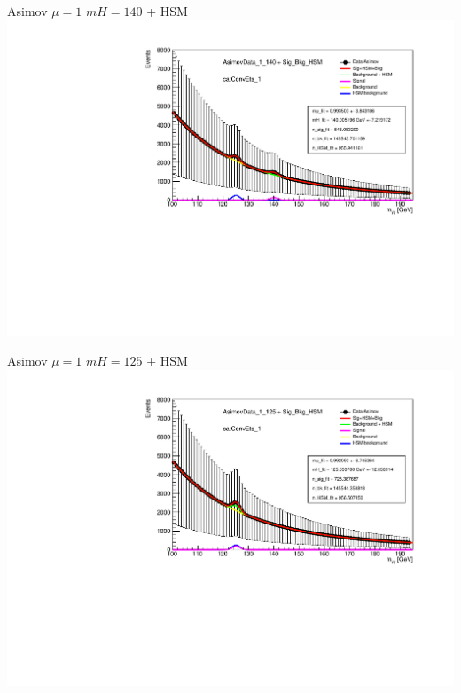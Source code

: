 \documentclass[10pt,UKenglish, leqno, xcolor = dvipsnames]{beamer}
\begin{document}
		\begin{frame}{Asimov $\mu=1$ $mH=140$ + HSM}
			\vfill
			\centering
			\includegraphics[width=\textwidth]{../images/week_15/HSM_AsimovData_1_140_catConvEta_1.pdf}
			\vfill
		\end{frame}
		
		\begin{frame}{Asimov $\mu=1$ $mH=125$ + HSM}
			\vfill
			\centering
			\includegraphics[width=\textwidth]{../images/week_15/HSM_AsimovData_1_125_catConvEta_1.pdf}
			\vfill
		\end{frame}
		
\end{document}
